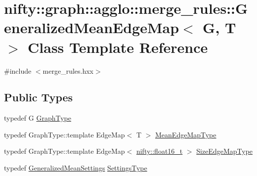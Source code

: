 \hypertarget{classnifty_1_1graph_1_1agglo_1_1merge__rules_1_1GeneralizedMeanEdgeMap}{}\section{nifty\+:\+:graph\+:\+:agglo\+:\+:merge\+\_\+rules\+:\+:Generalized\+Mean\+Edge\+Map$<$ G, T $>$ Class Template Reference}
\label{classnifty_1_1graph_1_1agglo_1_1merge__rules_1_1GeneralizedMeanEdgeMap}


{\ttfamily \#include $<$merge\+\_\+rules.\+hxx$>$}

\subsection*{Public Types}
\begin{DoxyCompactItemize}
\item 
typedef G \hyperlink{classnifty_1_1graph_1_1agglo_1_1merge__rules_1_1GeneralizedMeanEdgeMap_a8eb0e4528b41bb829281ea503ef0b1af}{Graph\+Type}
\item 
typedef Graph\+Type\+::template Edge\+Map$<$ T $>$ \hyperlink{classnifty_1_1graph_1_1agglo_1_1merge__rules_1_1GeneralizedMeanEdgeMap_a2d3bb0e976ea88885988a96dabe8c907}{Mean\+Edge\+Map\+Type}
\item 
typedef Graph\+Type\+::template Edge\+Map$<$ \hyperlink{namespacenifty_a20031b62bd5c16b943905d43a8ed361a}{nifty\+::float16\+\_\+t} $>$ \hyperlink{classnifty_1_1graph_1_1agglo_1_1merge__rules_1_1GeneralizedMeanEdgeMap_a7247a1bbc86e2363a43333f5a91be260}{Size\+Edge\+Map\+Type}
\item 
typedef \hyperlink{structnifty_1_1graph_1_1agglo_1_1merge__rules_1_1GeneralizedMeanSettings}{Generalized\+Mean\+Settings} \hyperlink{classnifty_1_1graph_1_1agglo_1_1merge__rules_1_1GeneralizedMeanEdgeMap_afbff572fe3361a2a080a72b4e396e4ef}{Settings\+Type}
\end{DoxyCompactItemize}
